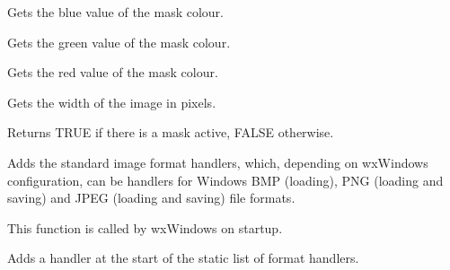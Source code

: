 
Gets the blue value of the mask colour.

\label{wximagegetmaskgreen}


Gets the green value of the mask colour.

\label{wximagegetmaskred}


Gets the red value of the mask colour.

\label{wximagegetwidth}


Gets the width of the image in pixels.



\label{wximagehasmask}


Returns TRUE if there is a mask active, FALSE otherwise.



Adds the standard image format handlers, which, depending on wxWindows
configuration, can be handlers for Windows BMP (loading), PNG
(loading and saving) and JPEG (loading and saving) file formats.

This function is called by wxWindows on startup.





Adds a handler at the start of the static list of format handlers.




